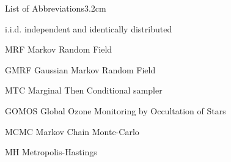 \begin{mclistof}{List of Abbreviations}{3.2cm}

\item[i.i.d.]  independent and identically distributed

\item[MRF] Markov Random Field

\item[GMRF] Gaussian Markov Random Field

\item[MTC] Marginal Then Conditional sampler

\item[GOMOS] Global Ozone Monitoring by Occultation of Stars

\item[MCMC] Markov Chain Monte-Carlo

\item[MH] Metropolis-Hastings
\end{mclistof} 
